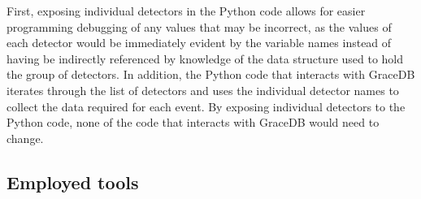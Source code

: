 \documentclass{article}
\begin{document}
\begin{itemize}
        First, exposing individual detectors in the Python code allows for easier programming debugging of any values that may be incorrect, as the values of each detector would be immediately evident by the variable names instead of having be indirectly referenced by knowledge of the data structure used to hold the group of detectors.
        In addition, the Python code that interacts with GraceDB iterates through the list of detectors and uses the individual detector names to collect the data required for each event.
        By exposing individual detectors to the Python code, none of the code that interacts with GraceDB would need to change.
\end{itemize}

\subsection{Employed tools} \label{sec:design_process:tools}
\end{document}
